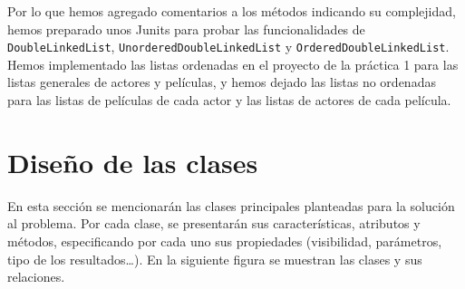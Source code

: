 \documentclass[a4paper,11pt]{report}
\begin{document}
Por lo que hemos agregado comentarios a los métodos indicando su complejidad, hemos preparado unos Junits para probar las funcionalidades de \texttt{DoubleLinkedList}, \texttt{UnorderedDoubleLinkedList} y \texttt{OrderedDoubleLinkedList}.
Hemos implementado las listas ordenadas en el proyecto de la práctica 1 para las listas generales de actores y películas, y hemos dejado las listas no ordenadas para las listas de películas de cada actor y las listas de actores de cada película.

\chapter{Diseño de las clases}
En esta sección se mencionarán las clases principales planteadas para la solución al problema. Por cada clase, se presentarán sus características, atributos y métodos, especificando por cada uno sus propiedades (visibilidad, parámetros, tipo de los resultados\ldots).
En la siguiente figura se muestran las clases y sus relaciones.
\end{document}
